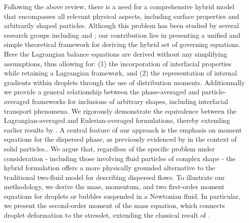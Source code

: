 Following the above review, there is a need for a comprehensive hybrid model that encompasses all relevant physical aspects, including surface properties and arbitrarily shaped particles. %
Although this problem has been studied by several research groups including \citet{lhuillier1992ensemble} and \citet{zhang1997momentum}; our contribution lies in presenting a unified and simple theoretical framework for deriving the hybrid set of governing equations. %
Here the Lagrangian balance equations are derived without any simplifying assumptions, thus allowing for: (1) the incorporation of interfacial properties while retaining a Lagrangian framework, and (2) the representation of internal gradients within droplets through the use of distribution moments.
Additionnally we provide a general relationship between the phase-averaged and particle-averaged frameworks for inclusions of arbitrary shapes, including interfacial transport phenomena.
We rigorously demonstrate the equivalence between the Lagrangian-averaged and Eulerian-averaged formulations, thereby extending earlier results by \citet{nott2011suspension}.
A central feature of our approach is the emphasis on moment equations for the dispersed phase, as previously evidenced by \citet{lhuillier2009rheology} in the context of solid particles.. %
We argue that, regardless of the specific problem under consideration - including those involving fluid particles of complex shape - the hybrid formulation offers a more physically grounded alternative to the traditional two-fluid model for describing dispersed flows.
To illustrate our methodology, we derive the mass, momentum, and two first-order moment equations for droplets or bubbles suspended in a Newtonian fluid. 
In particular, we present the second-order moment of the mass equation, which connects droplet deformation to the stresslet, extending the classical result of \citet{batchelor1970stress}.

